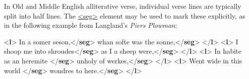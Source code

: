 In Old and Middle English alliterative verse, individual verse lines are typically split into half lines. The \hyperref[TEI.seg]{<seg>} element may be used to mark these explicitly, as in the following example from Langland's \textit{Piers Plowman}: \par\bgroup{}\exampleFont \begin{shaded}\noindent\mbox{}{<\textbf{l}>}\mbox{}\newline 
{}In a somer\mbox{}\newline 
\hspace*{1em}\hspace*{1em} seson,{</\textbf{seg}>}\mbox{}\newline 
{}whan softe was the sonne,{</\textbf{seg}>}\mbox{}\newline 
{</\textbf{l}>}\mbox{}\newline 
{<\textbf{l}>}\mbox{}\newline 
{}I shoop me into shroudes{</\textbf{seg}>}\mbox{}\newline 
{}as I a sheep were,{</\textbf{seg}>}\mbox{}\newline 
{</\textbf{l}>}\mbox{}\newline 
{<\textbf{l}>}\mbox{}\newline 
{}In habite as an heremite {</\textbf{seg}>}\mbox{}\newline 
{}unholy of werkes,{</\textbf{seg}>}\mbox{}\newline 
{</\textbf{l}>}\mbox{}\newline 
{<\textbf{l}>}\mbox{}\newline 
{}Went wide in this world {</\textbf{seg}>}\mbox{}\newline 
{}wondres to here.{</\textbf{seg}>}\mbox{}\newline 
{</\textbf{l}>}\end{shaded}\egroup\par \noindent  \par

